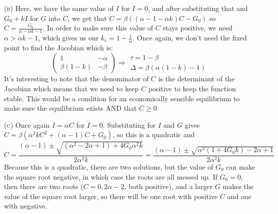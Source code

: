 \documentclass[11pt,answers]{exam}
\begin{document}
\begin{questions}
\begin{solution}
\textsc{(b)} Here, we have the same value of $I$ for $\dot{I} = 0$, and after substituting that and $G_0 + kI$ for $G$ into $\dot{C}$, we get that $\dot{C} = \beta((\alpha - 1 - \alpha k)C - G_0)$ so $C = \frac{G_0}{\alpha - \alpha k - 1}$.  In order to make sure this value of $C$ stays positive, we need $\alpha > \alpha k - 1$, which gives us our $\displaystyle k_c = 1 - \frac{1}{\alpha}$.  Once again, we don't need the fixed point to find the Jacobian which is:
\[
\left(\begin{array}{cc} 1 & -\alpha \\ \beta(1 - k) & -\beta \end{array}\right) \Rightarrow \begin{array}{c} \tau = 1 - \beta \\ \Delta = \beta(\alpha(1 - k) - 1) \end{array}
\]
It's interesting to note that the denominator of $C$ is the determinant of the Jacobian which means that we need to keep $C$ positive to keep the function stable.  This would be a condition for an economically sensible equilibrium to make sure the equilibrium exists AND that $C \geq 0$

\vspace{1em}

\textsc{(c)} Once again $I = \alpha C$ for $\dot{I} = 0$.  Substituting for $I$ and $G$ gives $\dot{C} = \beta(\alpha^2 k C^2 + (\alpha - 1)C + G_0)$, so this is a quadratic and 
\[
C = \frac{(\alpha - 1) \pm \sqrt{(\alpha ^2 - 2\alpha + 1) + 4G_0\alpha^2 k}}{2\alpha^2 k} = \frac{(\alpha - 1) \pm \sqrt{\alpha^2 (1 + 4G_0k) - 2\alpha + 1}}{2\alpha^2 k}
\]
Because this is a quadratic, there are two solutions, but the value of $G_0$ can make the square root negative, in which case the roots are all messed up.  If $G_0 = 0$, then there are two roots ($C = 0, 2\alpha - 2$, both positive), and a larger $G$ makes the value of the square root larger, so there will be one root with positive $C$ and one with negative.

\end{solution}
\end{questions}
\end{document}
